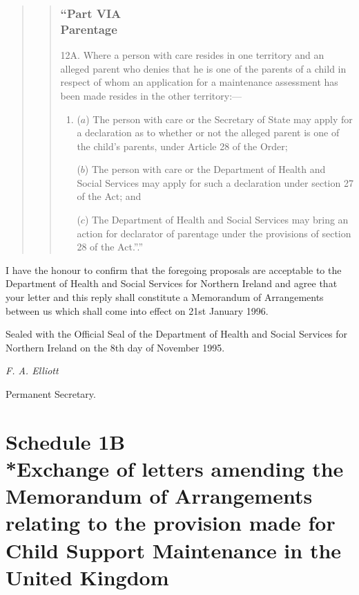\documentclass[12pt,a4paper]{article}
\begin{document}
\begin{quotation}
\begin{quotation}
 \section*{“Part VIA\\Parentage}

12A.  Where a person with care resides in one territory and an alleged parent who denies that he is one of the parents of a child in respect of whom an application for a maintenance assessment has been made resides in the other territory:—
\begin{enumerate}\item[]
\begin{sloppypar}
($a$) The person with care or the Secretary of State may apply for a declaration as to whether or not the alleged parent is one of the child’s parents, under Article 28 of the Order;
\end{sloppypar}

($b$) The person with care or the Department of Health and Social Services may apply for such a declaration under section 27 of the Act; and

($c$) The Department of Health and Social Services may bring an action for declarator of parentage under the provisions of section 28 of the Act.”.”
\end{enumerate}
\end{quotation}
\end{quotation}

  I have the honour to confirm that the foregoing proposals are acceptable to the Department of Health and Social Services for Northern Ireland and agree that your letter and this reply shall constitute a Memorandum of Arrangements between us which shall come into effect on 21st January 1996.

  Sealed with the Official Seal of the Department of Health and Social Services for Northern Ireland on the 8th day of November 1995.

  \emph{F. A. Elliott}

  Permanent Secretary.

\vfill

\part[Schedule 1B --- Exchange of letters amending the Memorandum of Arrangements relating to the provision made for Child Support Maintenance in the United Kingdom]{Schedule 1B\\*Exchange of letters amending the Memorandum of Arrangements relating to the provision made for Child Support Maintenance in the United Kingdom}
\end{document}

